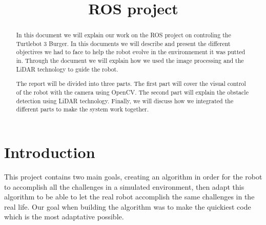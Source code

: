 \documentclass[conference]{IEEEtran}
\begin{document}
\title{ROS project}

\author{
    \and
}

\maketitle

\begin{abstract}
    In this document we will explain our work on the ROS project on controling the Turtlebot 3 Burger. In this documents we will describe and present the different objectives we had to face to help the robot evolve in the environnement it was putted in. Through the document we will explain how we used the image processing and the LiDAR technology to guide the robot.

    The report will be divided into three parts. The first part will cover the visual control of the robot with the camera using OpenCV. The second part will explain the obstacle detection using LiDAR technology. Finally, we will discuss how we integrated the different parts to make the system work together.
\end{abstract}

\section{Introduction}
This project contains two main goals, creating an algorithm in order for the robot to accomplish all the challenges in a simulated environment, then adapt this algorithm to be able to let the real robot accomplish the same challenges in the real life. Our goal when building the algorithm was to make the quickiest code which is the most adaptative possible.

\end{document}
